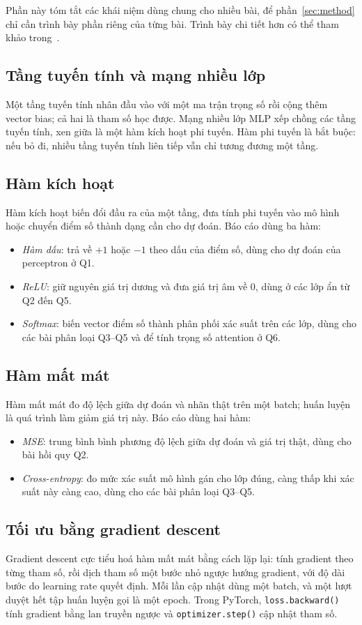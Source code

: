 \documentclass[conference]{IEEEtran}
\begin{document}
Phần này tóm tắt các khái niệm dùng chung cho nhiều bài, để
phần~\ref{sec:method} chỉ cần trình bày phần riêng của từng bài. Trình bày chi
tiết hơn có thể tham khảo trong~\cite{goodfellow}.

\subsection{Tầng tuyến tính và mạng nhiều lớp}
Một tầng tuyến tính nhân đầu vào với một ma trận trọng số rồi cộng thêm vector
bias; cả hai là tham số học được. Mạng nhiều lớp MLP
xếp chồng các tầng tuyến tính, xen giữa là một hàm kích hoạt phi tuyến. Hàm phi
tuyến là bắt buộc: nếu bỏ đi, nhiều tầng tuyến tính liên tiếp vẫn chỉ tương
đương một tầng.

\subsection{Hàm kích hoạt}
Hàm kích hoạt biến đổi đầu ra của một tầng, đưa tính phi tuyến vào mô hình
hoặc chuyển điểm số thành dạng cần cho dự đoán. Báo cáo dùng ba hàm:
\begin{itemize}
  \item \emph{Hàm dấu}: trả về $+1$ hoặc $-1$ theo dấu của điểm số, dùng cho dự
  đoán của perceptron ở Q1.
  \item \emph{ReLU}: giữ nguyên giá trị dương và đưa giá trị âm về 0, dùng ở
  các lớp ẩn từ Q2 đến Q5.
  \item \emph{Softmax}: biến vector điểm số thành phân phối xác suất
  trên các lớp, dùng cho các bài phân loại Q3--Q5 và để tính trọng số
  attention ở Q6.
\end{itemize}

\subsection{Hàm mất mát}
Hàm mất mát đo độ lệch giữa dự đoán và nhãn thật trên một batch; huấn luyện là
quá trình làm giảm giá trị này. Báo cáo dùng hai hàm:
\begin{itemize}
  \item \emph{MSE}: trung bình bình phương độ
  lệch giữa dự đoán và giá trị thật, dùng cho bài hồi quy Q2.
  \item \emph{Cross-entropy}: đo mức xác suất mô hình gán cho lớp đúng, càng
  thấp khi xác suất này càng cao, dùng cho các bài phân loại Q3--Q5.
\end{itemize}

\subsection{Tối ưu bằng gradient descent}
Gradient descent cực tiểu hoá hàm mất mát bằng cách lặp lại: tính gradient theo
từng tham số, rồi dịch tham số một bước nhỏ ngược hướng gradient, với độ dài
bước do learning rate quyết định. Mỗi lần cập nhật dùng một batch, và một lượt
duyệt hết tập huấn luyện gọi là một epoch. Trong PyTorch,
\texttt{loss.backward()} tính gradient bằng lan truyền ngược và
\texttt{optimizer.step()} cập nhật tham số.
\end{document}
